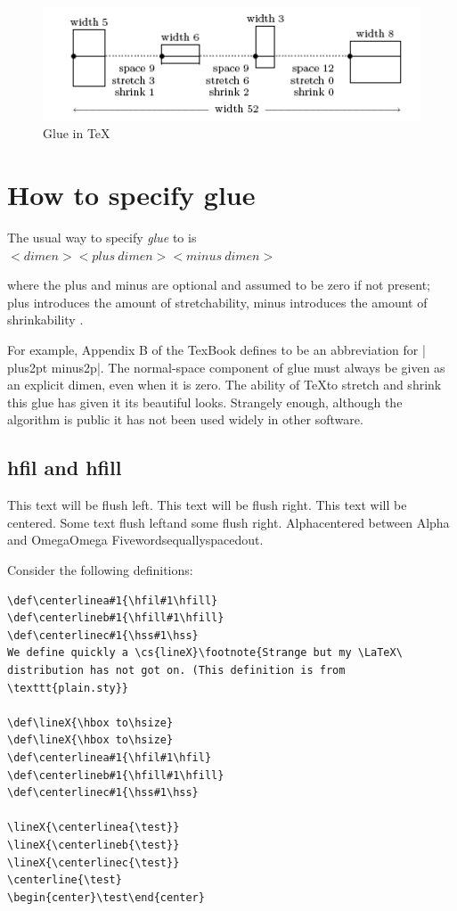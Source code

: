 \begin{figure}
  \centering
  \includegraphics[width=0.9\linewidth]{./images/glue.png}
  \caption{Glue in \TeX}
  \label{fig:glue}
\end{figure}


\section{How to specify glue}

The usual way to specify \textit{glue} to \tex is
$<dimen>< plus~dimen><minus~dimen>$

where the plus and minus are optional and assumed to be zero if not
present; plus introduces the amount of stretchability, minus introduces the amount of shrinkability . 

For example, Appendix B of the TexBook defines  to be an abbreviation for
|\vskip6pt plus2pt minus2p|. The normal-space component of glue must always be
given as an explicit dimen, even when it is zero. The ability of \TeX to stretch and shrink this glue has given it its beautiful looks. Strangely enough, although the algorithm is public it has not been used widely in other software.



\subsection*{hfil and hfill}

{\obeylines
{This text will be flush left.\hfil}
{\hfil This text will be flush right.}
{\hfil This text will be centered.\hfil}
{Some text flush left\hfil and some flush right.}
{Alpha\hfil centered between Alpha and Omega\hfil Omega}
{Five\hfil words\hfil equally\hfil spaced\hfil out.}
}

Consider the following definitions:

\begin{verbatim}
\def\centerlinea#1{\hfil#1\hfill}
\def\centerlineb#1{\hfill#1\hfill}
\def\centerlinec#1{\hss#1\hss}
We define quickly a \cs{lineX}\footnote{Strange but my \LaTeX\ distribution has not got on. (This definition is from \texttt{plain.sty}}

\def\lineX{\hbox to\hsize}
\def\lineX{\hbox to\hsize}
\def\centerlinea#1{\hfil#1\hfil}
\def\centerlineb#1{\hfill#1\hfill}
\def\centerlinec#1{\hss#1\hss}

\lineX{\centerlinea{\test}}
\lineX{\centerlineb{\test}}
\lineX{\centerlinec{\test}}
\centerline{\test}
\begin{center}\test\end{center}

\end{verbatim}


